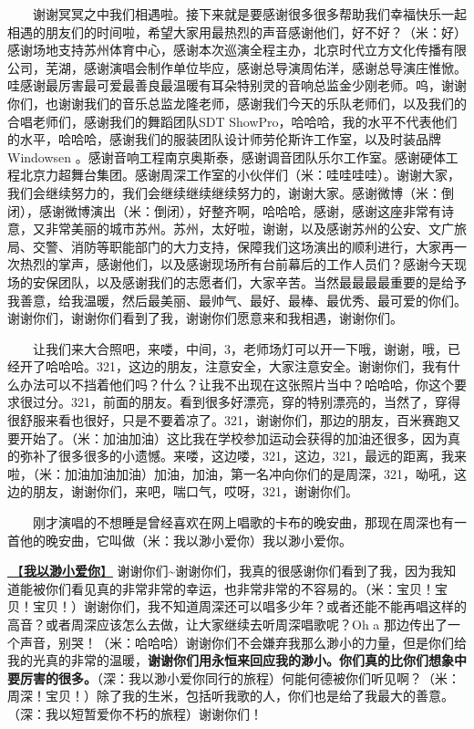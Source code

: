 \documentclass[]{ctexbook}
\begin{document}
  谢谢冥冥之中我们相遇啦。接下来就是要感谢很多很多帮助我们幸福快乐一起相遇的朋友们的时间啦，希望大家用最热烈的声音感谢他们，好不好？（米：好）感谢场地支持苏州体育中心，感谢本次巡演全程主办，北京时代立方文化传播有限公司，芜湖，感谢演唱会制作单位毕应，感谢总导演周佑洋，感谢总导演庄惟惞。哇感谢最厉害最可爱最善良最温暖有耳朵特别灵的音响总监金少刚老师。呜，谢谢你们，也谢谢我们的音乐总监龙隆老师，感谢我们今天的乐队老师们，以及我们的合唱老师们，感谢我们的舞蹈团队SDT ShowPro，哈哈哈，我的水平不代表他们的水平，哈哈哈，感谢我们的服装团队设计师劳伦斯许工作室，以及时装品牌 Windowsen 。感谢音响工程南京奥斯泰，感谢调音团队乐尔工作室。感谢硬体工程北京力超舞台集团。感谢周深工作室的小伙伴们（米：哇哇哇哇）。谢谢大家，我们会继续努力的，我们会继续继续继续努力的，谢谢大家。感谢微博（米：倒闭），感谢微博演出（米：倒闭），好整齐啊，哈哈哈，感谢，感谢这座非常有诗意，又非常美丽的城市苏州。苏州，太好啦，谢谢，以及感谢苏州的公安、文广旅局、交警、消防等职能部门的大力支持，保障我们这场演出的顺利进行，大家再一次热烈的掌声，感谢他们，以及感谢现场所有台前幕后的工作人员们？感谢今天现场的安保团队，以及感谢我们的志愿者们，大家辛苦。当然最最最最重要的是给予我善意，给我温暖，然后最美丽、最帅气、最好、最棒、最优秀、最可爱的你们。谢谢你们，谢谢你们看到了我，谢谢你们愿意来和我相遇，谢谢你们。

  让我们来大合照吧，来喽，中间，3，老师场灯可以开一下哦，谢谢，哦，已经开了哈哈哈。321，这边的朋友，注意安全，大家注意安全。谢谢你们，我有什么办法可以不挡着他们吗？什么？让我不出现在这张照片当中？哈哈哈，你这个要求很过分。321，前面的朋友。看到很多好漂亮，穿的特别漂亮的，当然了，穿得很舒服来看也很好，只是不要着凉了。321，谢谢你们，那边的朋友，百米赛跑又要开始了。（米：加油加油）这比我在学校参加运动会获得的加油还很多，因为真的弥补了很多很多的小遗憾。来喽，这边喽，321，这边，321，最远的距离，我来啦，（米：加油加油加油）加油，加油，第一名冲向你们的是周深，321，呦吼，这边的朋友，谢谢你们，来吧，喘口气，哎呀，321，谢谢你们。

  刚才演唱的不想睡是曾经喜欢在网上唱歌的卡布的晚安曲，那现在周深也有一首他的晚安曲，它叫做（米：我以渺小爱你）我以渺小爱你。

\hyperref[loving-you-in-my-humble-way]{🎵【\textbf{我以渺小爱你}】} 谢谢你们\textasciitilde 谢谢你们，我真的很感谢你们看到了我，因为我知道能被你们看见真的非常非常的幸运，也非常非常的不容易的。（米：宝贝！宝贝！宝贝！）谢谢你们，我不知道周深还可以唱多少年？或者还能不能再唱这样的高音？或者周深应该怎么去做，让大家继续去听周深唱歌呢？Oh a 那边传出了一个声音，别哭！（米：哈哈哈）谢谢你们不会嫌弃我那么渺小的力量，但是你们给我的光真的非常的温暖，\textbf{谢谢你们用永恒来回应我的渺小。你们真的比你们想象中要厉害的很多。}（深：我以渺小爱你同行的旅程）何能何德被你们听见啊？（米：周深！宝贝！）除了我的生米，包括听我歌的人，你们也是给了我最大的善意。（深：我以短暂爱你不朽的旅程）谢谢你们！
\end{document}

